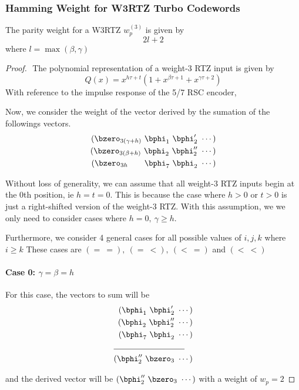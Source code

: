 \subsubsection{Hamming Weight for W3RTZ Turbo Codewords }
The parity weight for a W3RTZ  $w^{(3)}_{p}$ is given by
\begin{equation}
2l+2
\label{RTZInputs-2}
\end{equation}
where $l=\max(\beta,\gamma)$
\begin{proof}
$ $\newline
The polynomial representation of a weight-$3$ RTZ input is given by $$Q(x) =x^{h\tau+t}(1+x^{\beta \tau +1}+x^{\gamma \tau +2})$$
With reference to the impulse response of the 5/7  RSC encoder, 



Now, we consider the weight of the vector derived by the sumation of the followings vectors.
\begin{eqnarray*}
(\bzero_{3(\gamma+h)}~\bphi_1~\bphi'_2~\cdots)\cr
(\bzero_{3(\beta+h)}~\bphi_2~\bphi''_2~\cdots)\cr
(\bzero_{3 h}~~~~~~\bphi_7~\bphi_2~\cdots)
\end{eqnarray*}

Without loss of generality, we can assume that all weight-$3$ RTZ inputs begin at the $0$th position, ie $h=t=0$. This is because the case where $h>0$ or $t>0$ is just a right-shifted version of the weight-$3$ RTZ. With this assumption, we we only need to consider cases where $h= 0,~\gamma \geq h$.

Furthermore, we consider 4 general cases for all possible values of $i,j,k$ where $i \geq k$ These cases are $(=~=),~(=~<),~(<~=)$ and $(<~<)$
\paragraph{Case 0: $\gamma=\beta=h$ \newline}

 For this case, the vectors to sum will be 
 \begin{align*}
(\bphi_1~\bphi'_2~\cdots)\\
(\bphi_2~\bphi''_2~\cdots)\\
(\bphi_7~\bphi_2~\cdots)\\
\cline{1-2}
(\bphi''_2~\bzero_{3}~\cdots)
\end{align*}
 
and  the derived vector will be $(\bphi''_2~\bzero_{3}~\cdots)$ with a weight of $w_p=2$
 

\end{proof}
